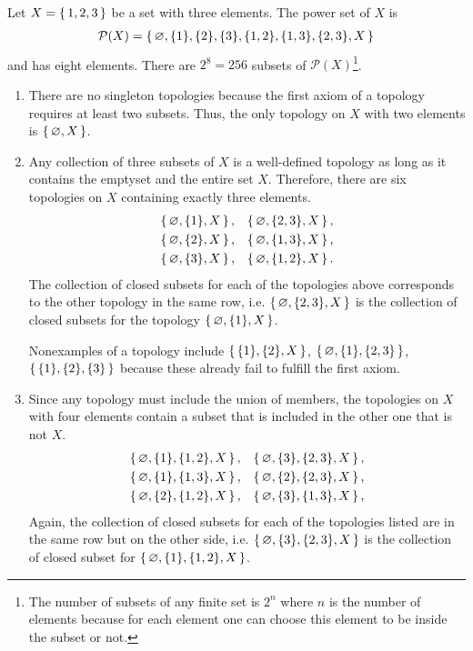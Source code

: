 %
\begin{example}
    Let \(X = \left\{\, 1, 2, 3 \,\right\}\) be a set with three elements. The power set of \(X\) is
    \begin{align*}
        \mathcal{P}(X) = \left\{\, \varnothing, \{1\}, \{2\}, \{3\}, \{1, 2\}, \{1, 3\}, \{2, 3\}, X \,\right\}
    \end{align*}
    and has eight elements. There are \(2^8 = 256\) subsets of \(\mathcal{P}(X)\)\footnote{The number of subsets of any finite set is \(2^n\) where \(n\) is the number of elements because for each element one can choose this element to be inside the subset or not.}.
    \begin{enumerate}
        \item There are no singleton topologies because the first axiom of a topology requires at least two subsets. Thus, the only topology on \(X\) with two elements is \(\left\{\, \varnothing, X \,\right\}\).
        \item Any collection of three subsets of \(X\) is a well-defined topology as long as it contains the emptyset and the entire set \(X\). Therefore, there are six topologies on \(X\) containing exactly three elements.
        \begin{align*}
            \left\{\, \varnothing, \{1\}, X \,\right\} \text{,} & & \left\{\, \varnothing, \{2, 3\}, X \,\right\} \text{,}\\
            \left\{\, \varnothing, \{2\}, X \,\right\} \text{,} & & \left\{\, \varnothing, \{1, 3\}, X \,\right\} \text{,}\\
            \left\{\, \varnothing, \{3\}, X \,\right\} \text{,} & & \left\{\, \varnothing, \{1, 2\}, X \,\right\} \text{.}\\
        \end{align*}
        The collection of closed subsets for each of the topologies above corresponds to the other topology in the same row, i.e. \(\left\{\, \varnothing, \{2, 3\}, X \,\right\}\) is the collection of closed subsets for the topology \(\left\{\, \varnothing, \{1\}, X \,\right\}\).
        
        Nonexamples of a topology include \(\left\{\, \{1\}, \{2\}, X \,\right\}\), \(\left\{\, \varnothing, \{1\}, \{2, 3\} \,\right\}\), \(\left\{\, \{1\}, \{2\}, \{3\} \,\right\}\) because these already fail to fulfill the first axiom.
        \item Since any topology must include the union of members, the topologies on \(X\) with four elements contain a subset that is included in the other one that is not \(X\).
        \begin{align*}
            \left\{\, \varnothing, \{1\}, \{1, 2\}, X \,\right\} \text{,} & & \left\{\, \varnothing, \{3\}, \{2, 3\}, X \,\right\} \text{,} \\
            \left\{\, \varnothing, \{1\}, \{1, 3\}, X \,\right\} \text{,} & & \left\{\, \varnothing, \{2\}, \{2, 3\}, X \,\right\} \text{,} \\
            \left\{\, \varnothing, \{2\}, \{1, 2\}, X \,\right\} \text{,} & & \left\{\, \varnothing, \{3\}, \{1, 3\}, X \,\right\} \text{,} \\
        \end{align*}
        Again, the collection of closed subsets for each of the topologies listed are in the same row but on the other side, i.e. \(\left\{\, \varnothing, \{3\}, \{2, 3\}, X \,\right\}\) is the collection of closed subset for \(\left\{\, \varnothing, \{1\}, \{1, 2\}, X \,\right\}\).


\end{enumerate}
\end{example}
